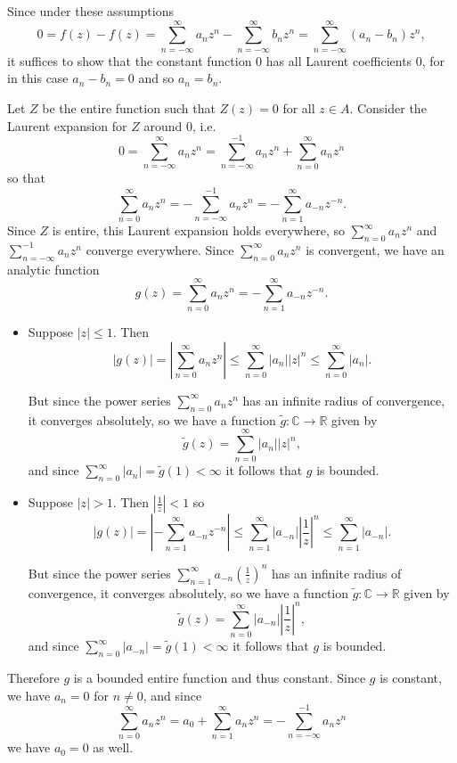 \documentclass{article}
\begin{document}
\begin{Answer}
Since under these assumptions
$$
  0 
= f(z) - f(z) 
= \sum_{n=-\infty}^\infty a_n z^n - \sum_{n=-\infty}^\infty b_n z^n
= \sum_{n=-\infty}^\infty (a_n - b_n) z^n,
$$
it suffices to show that the constant function 0 has all
Laurent coefficients 0, for in this case $a_n - b_n = 0$ and
so $a_n = b_n$.

Let $Z$ be the entire function such that 
$Z(z) = 0$ for all $z \in A$. Consider the Laurent expansion for $Z$ around 0, i.e.
$$
  0
= \sum_{n=-\infty}^\infty a_n z^n 
= \sum_{n=-\infty}^{-1} a_n z^n
+ \sum_{n=0}^\infty a_n z^n
$$
so that
$$
   \sum_{n=0}^\infty a_n z^n 
= -\sum_{n=-\infty}^{-1} a_n z^n
= -\sum_{n=1}^\infty a_{-n} z^{-n}.
$$
Since $Z$ is entire, this Laurent expansion holds everywhere, so
$\sum_{n=0}^\infty a_n z^n$ and $\sum_{n=-\infty}^{-1} a_n z^n$ converge everywhere.
Since $\sum_{n=0}^\infty a_n z^n$ is convergent, we have an analytic
function
$$
g(z) = \sum_{n=0}^\infty a_n z^n = -\sum_{n=1}^\infty a_{-n} z^{-n}.
$$
\begin{itemize}
  \item{
    Suppose $|z| \leq 1$. Then
    $$
         |g(z)| 
    =    \left|\sum_{n=0}^\infty a_n z^n\right|
    \leq \sum_{n=0}^\infty |a_n| |z|^n
    \leq \sum_{n=0}^\infty |a_n|.
    $$
    
    But since the power series 
    $\sum_{n=0}^\infty a_n z^n$ has an infinite radius of convergence,
    it converges absolutely, so we have a function 
    $\tilde{g} : \mathbb{C} \to \mathbb{R}$ given by
    $$
    \tilde{g}(z) = \sum_{n=0}^\infty |a_n||z|^n,
    $$
    and since $\sum_{n=0}^\infty |a_n| = \tilde{g}(1) < \infty$
    it follows that $g$ is bounded.
  }
  \item{
    Suppose $|z| > 1$. Then $\left|\frac{1}{z}\right| < 1$ so
    $$
         |g(z)|
    =    \left|-\sum_{n=1}^\infty a_{-n} z^{-n}\right|
    \leq \sum_{n=1}^\infty 
           |a_{-n}|
           \left|\frac{1}{z}\right|^n
    \leq \sum_{n=1}^\infty |a_{-n}|.
    $$

    But since the power series 
    $\sum_{n=1}^\infty a_{-n} \left(\frac{1}{z}\right)^n$ has an infinite
    radius of convergence, it converges absolutely, so we have a function
    $\tilde{g} : \mathbb{C} \to \mathbb{R}$ given by
    $$
    \tilde{g}(z) = \sum_{n=0}^\infty |a_{-n}|\left|\frac{1}{z}\right|^n,
    $$
    and since $\sum_{n=0}^\infty |a_{-n}| = \tilde{g}(1) < \infty$ it follows
    that $g$ is bounded.
  }
\end{itemize}
Therefore $g$ is a bounded entire function and thus constant.
Since $g$ is constant, we have $a_n = 0$ for $n \neq 0$, and 
since
$$
  \sum_{n=0}^\infty a_n z^n 
= a_0 + \sum_{n=1}^\infty a_n z^n
= -\sum_{n=-\infty}^{-1} a_n z^n
$$
we have $a_0 = 0$ as well.
\end{Answer}
\end{document}
